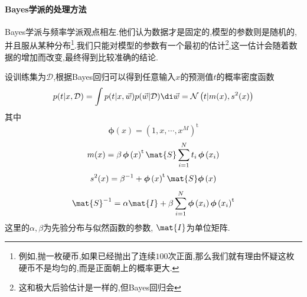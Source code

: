 \documentclass{ctexart}
\begin{document}
\paragraph{Bayes学派的处理方法}
Bayes学派与频率学派观点相左.他们认为数据才是固定的,模型的参数则是随机的,并且服从某种分布\footnote{例如,抛一枚硬币,如果已经抛出了连续$100$次正面,那么我们就有理由怀疑这枚硬币不是均匀的,而是正面朝上的概率更大.}.我们只能对模型的参数有一个最初的估计\footnote{这和极大后验估计是一样的,但Bayes回归会},这一估计会随着数据的增加而改变,最终得到比较准确的结论.
\begin{theorem}[Bayes回归]
    设训练集为$\mathcal{D}$,根据Bayes回归可以得到任意输入$x$的预测值$t$的概率密度函数
    \[p(t|x,\mathcal{D})=\int p(t|x,\vec{w})p(\vec{w}|\mathcal{D})\di\vec{w}=\mathcal{N}\left(t|m(x),s^2(x)\right)\]
    其中
    \[\boldsymbol{\phi}\left(x\right)=\left(1,x,\cdots,x^M\right)^{\mathrm{t}}\]
    \[m(x)=\beta\,\boldsymbol{\phi}\left(x\right)^{\mathrm{t}}\mat{S}\sum_{i=1}^{N}t_i\,\boldsymbol{\phi}\left(x_i\right)\]
    \[s^2(x)=\beta^{-1}+\boldsymbol{\phi}\left(x\right)^{\mathrm{t}}\mat{S}\boldsymbol{\phi}\left(x\right)\]
    \[\mat{S}^{-1}=\alpha\mat{I}+\beta\sum_{i=1}^{N}\boldsymbol{\phi}\left(x_i\right)\boldsymbol{\phi}\left(x_i\right)^{\mathrm{t}}\]
    这里的$\alpha,\beta$为先验分布与似然函数的参数, $\mat{I}$为单位矩阵.
\end{theorem}
\end{document}
